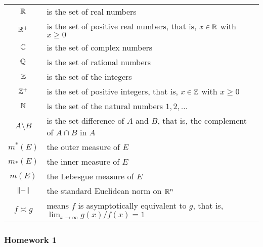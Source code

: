 \begin{tabular}{cl}
  \(\mathbb{R}\) & is the set of real numbers\\
  \(\mathbb{R}^+\) & is the set of positive real numbers, that is, \(x\in\mathbb{R}\) with
             \(x\geq 0\)\\
  \(\mathbb{C}\) & is the set of complex numbers\\
  \(\mathbb{Q}\) & is the set of rational numbers\\
  \(\mathbb{Z}\) & is the set of the integers\\
  \(\mathbb{Z}^+\) & is the set of positive integers, that is, \(x\in\mathbb{Z}\) with
             \(x\geq 0\)\\
  \(\mathbb{N}\) & is the set of the natural numbers \(1,2,\dotsc\)\\
  \(A\setminus B\) & is the set difference of \(A\) and \(B\), that is, the
                        complement of \(A\cap B\) in \(A\)\\
  \(m^*(E)\) & the outer measure of \(E\)\\
  \(m_*(E)\) & the inner measure of \(E\)\\
  \(m(E)\) & the Lebesgue measure of \(E\)\\
  \(\|{-}\|\) & the standard Euclidean norm on \(\mathbb{R}^n\)\\
  \(f\asymp g\) & means \(f\) is asymptotically equivalent to \(g\), that is,
                \(\lim_{x\to\infty} g(x)/f(x)=1\)\\
\end{tabular}

\newpage

\subsubsection{Homework 1}
\setcounter{exercise}{0}
\setcounter{equation}{0}

